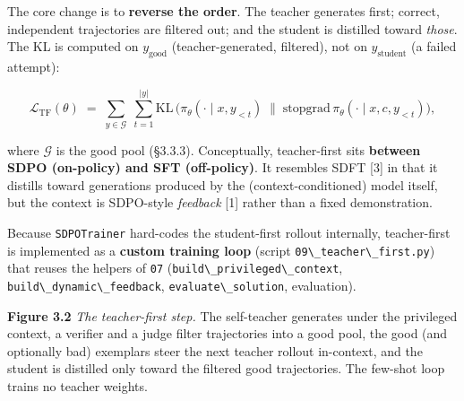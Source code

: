 The core change is to \textbf{reverse the order}. The teacher generates first; correct, independent trajectories are filtered out; and the student is distilled toward \emph{those}. The KL is computed on \(y_{\text{good}}\) (teacher-generated, filtered), not on \(y_{\text{student}}\) (a failed attempt):

\[
\mathcal{L}_{\text{TF}}(\theta) \;=\; \sum_{y \in \mathcal{G}} \; \sum_{t=1}^{|y|} \mathrm{KL}\,\Big(\pi_\theta(\cdot \mid x, y_{<t}) \;\big\|\; \mathrm{stopgrad}\,\pi_\theta(\cdot \mid x, c, y_{<t})\Big),
\]

where \(\mathcal{G}\) is the good pool (§3.3.3). Conceptually, teacher-first sits \textbf{between SDPO (on-policy) and SFT (off-policy)}. It resembles SDFT {[}3{]} in that it distills toward generations produced by the (context-conditioned) model itself, but the context is SDPO-style \emph{feedback} {[}1{]} rather than a fixed demonstration.

Because \passthrough{\lstinline!SDPOTrainer!} hard-codes the student-first rollout internally, teacher-first is implemented as a \textbf{custom training loop} (script \passthrough{\lstinline!09\_teacher\_first.py!}) that reuses the helpers of \passthrough{\lstinline!07!} (\passthrough{\lstinline!build\_privileged\_context!}, \passthrough{\lstinline!build\_dynamic\_feedback!}, \passthrough{\lstinline!evaluate\_solution!}, evaluation).

\begin{center}\end{center}

\textbf{Figure 3.2}
\emph{The teacher-first step.} The self-teacher generates under the privileged context, a verifier and a judge filter trajectories into a good pool, the good (and optionally bad) exemplars steer the next teacher rollout in-context, and the student is distilled only toward the filtered good trajectories. The few-shot loop trains no teacher weights.

